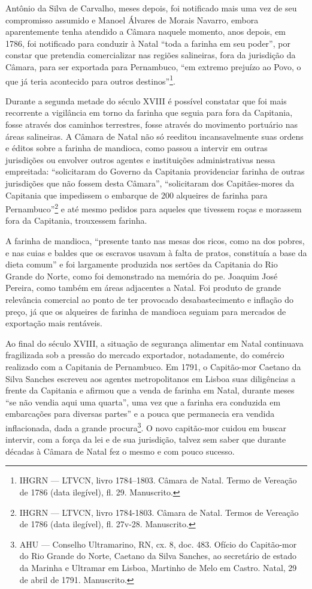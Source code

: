 \begin{refsection}
Antônio da Silva de Carvalho, meses depois, foi notificado mais uma vez de seu compromisso assumido e Manoel Álvares de Morais Navarro, embora aparentemente tenha atendido a Câmara naquele momento, anos depois, em 1786, foi notificado para conduzir à Natal “toda a farinha em seu poder”, por constar que pretendia comercializar nas regiões salineiras, fora da jurisdição da Câmara, para ser exportada para Pernambuco, “em extremo prejuízo ao Povo, o que já teria acontecido para outros destinos”\footnote{IHGRN --- LTVCN, livro 1784--1803. Câmara de Natal. Termo de Vereação de 1786 (data ilegível), fl. 29. Manuscrito.}.  

Durante a segunda metade do século XVIII é possível constatar que foi mais recorrente a vigilância em torno da farinha que seguia para fora da Capitania, fosse através dos caminhos terrestres, fosse através do movimento portuário nas áreas salineiras. A Câmara de Natal não só reeditou incansavelmente suas ordens e éditos sobre a farinha de mandioca, como passou a intervir em outras jurisdições ou envolver outros agentes e instituições administrativas nessa empreitada: “solicitaram do Governo da Capitania providenciar farinha de outras jurisdições que não fossem desta Câmara”, “solicitaram dos Capitães-mores da Capitania que impedissem o embarque de 200 alqueires de farinha para Pernambuco”\footnote{IHGRN --- LTVCN, livro 1784-1803. Câmara de Natal. Termos de Vereação de 1786 (data ilegível), fl. 27v-28. Manuscrito.} e até mesmo pedidos para aqueles que tivessem roças e morassem fora da Capitania, trouxessem farinha.

A farinha de mandioca, “presente tanto nas mesas dos ricos, como na dos pobres, e nas cuias e baldes  que os escravos usavam à falta de pratos, constituía a base da dieta comum” \cite[p.~96]{Barickman2003acucar} e foi largamente produzida nos sertões da Capitania do Rio Grande do Norte, como foi demonstrado na memória do pe. Joaquim José Pereira, como também em áreas adjacentes a Natal. Foi produto de grande relevância comercial ao ponto de ter provocado desabastecimento e inflação do preço, já que os alqueires de farinha de mandioca seguiam para mercados de exportação mais rentáveis.   

Ao final do século XVIII, a situação de segurança alimentar em Natal continuava fragilizada sob a pressão do mercado exportador, notadamente, do comércio realizado com a Capitania de Pernambuco. Em 1791, o Capitão-mor Caetano da Silva Sanches escreveu aos agentes metropolitanos em Lisboa suas diligências a frente da Capitania e afirmou que a venda de farinha em Natal, durante meses “se não vendia aqui uma quarta”, uma vez que a farinha era conduzida em embarcações para diversas partes” e a pouca que permanecia era vendida inflacionada, dada a grande procura\footnote{AHU --- Conselho Ultramarino, RN, cx. 8, doc. 483. Ofício do Capitão-mor do Rio Grande do Norte, Caetano da Silva Sanches, ao secretário de estado da Marinha e Ultramar em Lisboa, Martinho de Melo em Castro. Natal, 29 de abril de 1791. Manuscrito.}. O novo capitão-mor cuidou em buscar intervir, com a força da lei e de sua jurisdição, talvez sem saber que durante décadas à Câmara de Natal fez o mesmo e com pouco sucesso. 


\end{refsection}
